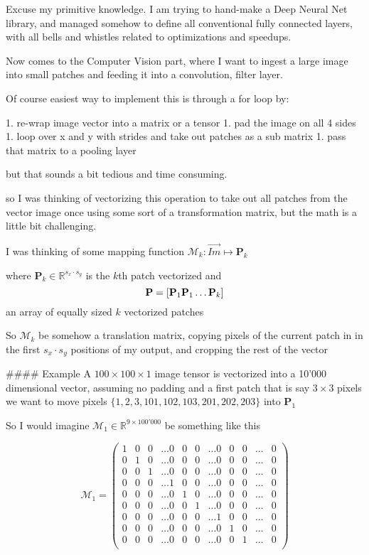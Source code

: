 Excuse my primitive knowledge. I am trying to hand-make a Deep Neural Net library, and managed somehow to define all conventional fully connected layers, with all bells and whistles related to optimizations and speedups. 

Now comes to the Computer Vision part, where I want to ingest a large image into small patches and feeding it into a convolution, filter layer.

Of course easiest way to implement this is through a for loop by:

1. re-wrap image vector into a matrix or a tensor 
1. pad the image on all 4 sides
1. loop over x and y with strides and take out patches as a sub matrix 
1. pass that matrix to a pooling layer

but that sounds a bit tedious and time consuming.

so I was thinking of vectorizing this operation to take out all patches from the vector image once using some sort of a transformation matrix, but the math is a little bit challenging. 

I was thinking of some mapping function $\mathcal{M}_k : \vec{Im} \mapsto \mathbf{P}_k$ 

where $\mathbf{P}_k \in \mathbb{R}^{s_x \cdot s_y}$ is the $k$th patch vectorized and $$ \mathbf{P} = \large [ \mathbf{P}_1 \mathbf{P}_1 \dots \mathbf{P}_k \large ] $$ an array of equally sized $k$ vectorized patches 

So $\mathcal{M}_k$ be somehow a translation matrix, copying pixels of the current patch in in the first $s_x \cdot s_y$ positions of my output, and cropping the rest of the vector

#### Example 
A $100 \times 100 \times 1$ image tensor is vectorized into a 10'000 dimensional vector, assuming no padding and a first patch that is say $3 \times 3$ pixels we want to move pixels $ \{ 1, 2, 3, 101, 102, 103, 201, 202, 203\}$ into $\mathbf{P}_1$

So I would imagine $\mathcal{M}_1 \in \mathbb{R}^{9 \times 100'000}$ be something like this 

$$ \mathcal{M}_1 = 
\begin{pmatrix}
         1 & 0 & 0 & \dots 0 & 0 & 0 & \dots 0 & 0 & 0 & \dots & 0 \\
         0 & 1 & 0 & \dots 0 & 0 & 0 & \dots 0 & 0 & 0 & \dots & 0 \\
         0 & 0 & 1 & \dots 0 & 0 & 0 & \dots 0 & 0 & 0 & \dots & 0 \\
         0 & 0 & 0 & \dots 1 & 0 & 0 & \dots 0 & 0 & 0 & \dots & 0 \\
         0 & 0 & 0 & \dots 0 & 1 & 0 & \dots 0 & 0 & 0 & \dots & 0 \\
         0 & 0 & 0 & \dots 0 & 0 & 1 & \dots 0 & 0 & 0 & \dots & 0 \\
         0 & 0 & 0 & \dots 0 & 0 & 0 & \dots 1 & 0 & 0 & \dots & 0 \\
         0 & 0 & 0 & \dots 0 & 0 & 0 & \dots 0 & 1 & 0 & \dots & 0 \\
         0 & 0 & 0 & \dots 0 & 0 & 0 & \dots 0 & 0 & 1 & \dots & 0 \\
\end{pmatrix}
$$

